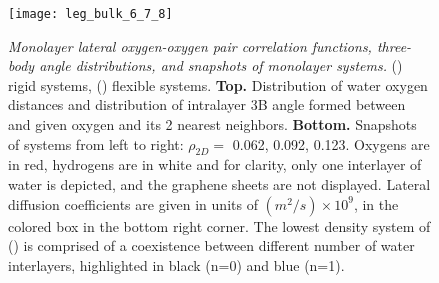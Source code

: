\documentclass[journal=acsnano,manuscript=article]{achemso}
\begin{document}
\setlength{\fboxsep}{0.75pt}%
\setlength{\fboxrule}{1.2pt}%

\begin{figure}[ht!]
	\centering
	\texttt{[image: leg\_bulk\_6\_7\_8]}\\
	\caption{\textit{Monolayer lateral oxygen-oxygen pair correlation functions, three-body angle distributions, and snapshots of monolayer systems.} (\protect{}) rigid systems, (\protect{}) flexible systems.  \textbf{Top.} Distribution of water oxygen distances and distribution of intralayer 3B angle formed between and given oxygen and its 2 nearest neighbors. \textbf{Bottom.} Snapshots of systems from left to right: \(\rho_{2D}=\) 0.062, 0.092, 0.123. Oxygens are in red, hydrogens are in white and for clarity, only one interlayer of water is depicted, and the graphene sheets are not displayed. Lateral diffusion coefficients are given in units of \((m^2/s) \times 10^9\), in the colored box in the bottom right corner. The lowest density system of (\protect{}) is comprised of a coexistence between different number of water interlayers, highlighted in black (n=0) and blue (n=1).}
	\label{fig:struct_6_7_8}
\end{figure}
\end{document}
